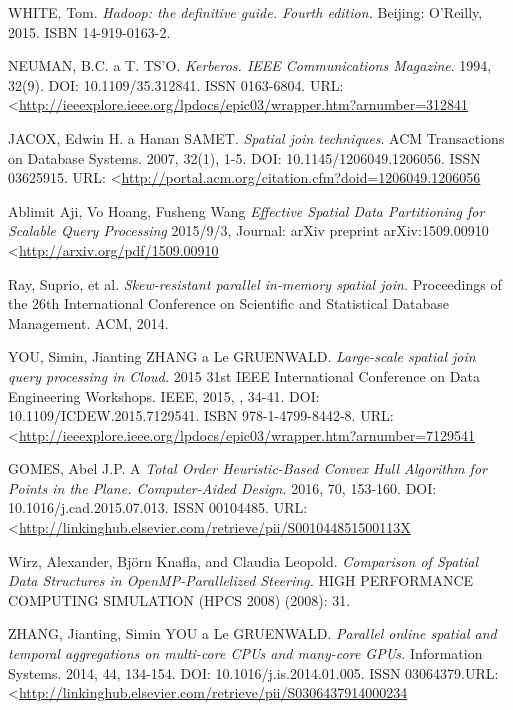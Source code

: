 \documentclass[a4paper,12pt,oneside]{report}
\begin{document}
	\begin{thebibliography}{99}
		\label{References}
		
		
		
		WHITE, Tom. \textit{Hadoop: the definitive guide. Fourth edition.} Beijing:
		O'Reilly, 2015. ISBN 14-919-0163-2.
		
		NEUMAN, B.C. a T. TS'O. \textit{Kerberos. IEEE Communications Magazine}. 1994,
		32(9). DOI: 10.1109/35.312841. ISSN 0163-6804.  URL:
		\textless\url{http://ieeexplore.ieee.org/lpdocs/epic03/wrapper.htm?arnumber=312841}
		
		
		JACOX, Edwin H. a Hanan SAMET. \textit{Spatial join techniques}. ACM
		Transactions on Database Systems. 2007, 32(1), 1-5. DOI:
		10.1145/1206049.1206056. ISSN 03625915. URL:
		\textless\url{http://portal.acm.org/citation.cfm?doid=1206049.1206056}
		
		Ablimit Aji, Vo Hoang, Fusheng Wang \textit{Effective Spatial Data Partitioning
			for Scalable Query Processing} 2015/9/3,
		Journal: arXiv preprint arXiv:1509.00910
		\textless\url{http://arxiv.org/pdf/1509.00910}
		
		Ray, Suprio, et al. \textit{Skew-resistant parallel in-memory spatial join.}
		Proceedings of the 26th International Conference on Scientific and Statistical
		Database Management. ACM, 2014.
		
		YOU, Simin, Jianting ZHANG a Le GRUENWALD. \textit{Large-scale spatial join
			query processing in Cloud.} 2015 31st IEEE International Conference on Data
		Engineering Workshops. IEEE, 2015, , 34-41. DOI: 10.1109/ICDEW.2015.7129541.
		ISBN 978-1-4799-8442-8. URL:
		\textless\url{http://ieeexplore.ieee.org/lpdocs/epic03/wrapper.htm?arnumber=7129541}
		
		GOMES, Abel J.P. A \textit{Total Order Heuristic-Based Convex Hull Algorithm for
			Points in the Plane. Computer-Aided Design.} 2016, 70, 153-160. DOI:
		10.1016/j.cad.2015.07.013. ISSN 00104485.  URL:
		\textless\url{http://linkinghub.elsevier.com/retrieve/pii/S001044851500113X}
		
		Wirz, Alexander, Björn Knafla, and Claudia Leopold. \textit{Comparison of
			Spatial Data Structures in OpenMP-Parallelized Steering.} HIGH PERFORMANCE
		COMPUTING  SIMULATION (HPCS 2008) (2008): 31.
		
		ZHANG, Jianting, Simin YOU a Le GRUENWALD. \textit{Parallel online spatial and
			temporal aggregations on multi-core CPUs and many-core GPUs.} Information
		Systems. 2014, 44, 134-154. DOI: 10.1016/j.is.2014.01.005. ISSN 03064379.URL: 
		\textless\url{http://linkinghub.elsevier.com/retrieve/pii/S0306437914000234}
		

\end{thebibliography}
\end{document}
